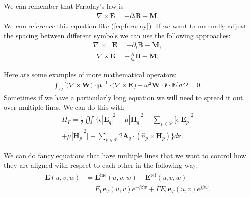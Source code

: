 We can remember that Faraday's law is
\begin{align} %
	\nabla\times\mathbf{E} = -\partial_t \mathbf{B} - \mathbf{M}.
	\label{eq:faraday}
\end{align}
We can reference this equation like (\ref{eq:faraday}). If we want to manually adjust the spacing between different symbols we can use the following approaches:
\begin{align} %
	\nabla \, \times \,\,\,\, \mathbf{E} = -\partial_t \mathbf{B} - \mathbf{M},
	\label{eq:faraday2}
\end{align}
\begin{align} %
	\nabla \! \times \! \mathbf{E} = -\frac{\partial}{\partial t} \mathbf{B} - \mathbf{M}.
	\label{eq:faraday3}
\end{align}

Here are some examples of more mathematical operators:
\begin{align}
	\int_\Omega \bigg[  \big( \nabla\times\mathbf{W}\big) \cdot  \overline{\boldsymbol{\mu}}^{-1}  \cdot \big(\nabla\times\mathbf{E} \big) -   \omega^2 \mathbf{W} \cdot \overline{\boldsymbol{\epsilon}}  \cdot  \mathbf{E} \bigg] d\Omega = 0.
\end{align}
Sometimes if we have a particularly long equation we will need to spread it out over multiple lines. We can do this with
\begin{multline}  %
	H_F = \frac{1}{2}\iiint \bigg\{ \epsilon |\mathbf{E}_q|^2 + \mu | \mathbf{H}_q|^2 + \sum_{p \in \mathcal{P}} \big[ \epsilon |\mathbf{E}_p|^2  \\ + \mu | \mathbf{H}_p|^2  \big]  - \sum_{p \in \mathcal{P}} 2 \mathbf{A}_q \cdot (\hat{n}_p\times \mathbf{H}_p ) \bigg\} d\mathbf{r}.
	\label{eq:interacting-system-hamiltonian}
\end{multline} 

We can do fancy equations that have multiple lines that we want to control how they are aligned with respect to each other in the following way:
\begin{align}
	\begin{split} %
		\mathbf{E}(u,v,w)  &= \mathbf{E}^\mathrm{inc}(u,v,w) + \mathbf{E}^\mathrm{ref}(u,v,w)  \\
		&= E_0 \mathbf{e}_T(u,v) e^{-j \beta w} + \Gamma E_0 \mathbf{e}_T(u,v) e^{j\beta w}.
	\end{split}
	\label{eq:waveport1}
\end{align}

